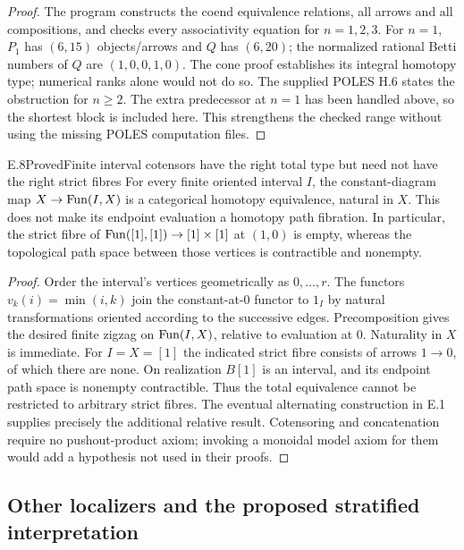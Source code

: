 \begin{proof}
The program constructs the coend equivalence relations, all arrows and all compositions, and checks every associativity equation for $n=1,2,3$. For $n=1$, $P_1$ has $(6,15)$ objects/arrows and $Q$ has $(6,20)$; the normalized rational Betti numbers of $Q$ are $(1,0,0,1,0)$. The cone proof establishes its integral homotopy type; numerical ranks alone would not do so. The supplied POLES H.6 states the obstruction for $n\geq2$. The extra predecessor at $n=1$ has been handled above, so the shortest block is included here. This strengthens the checked range without using the missing POLES computation files.
\end{proof}

\begin{result}{E.8}{Proved}{Finite interval cotensors have the right total type but need not have the right strict fibres}
For every finite oriented interval $I$, the constant-diagram map $X\to\operatorname{Fun}(I,X)$ is a categorical homotopy equivalence, natural in $X$. This does not make its endpoint evaluation a homotopy path fibration. In particular, the strict fibre of $\operatorname{Fun}([1],[1])\to[1]\times[1]$ at $(1,0)$ is empty, whereas the topological path space between those vertices is contractible and nonempty.
\end{result}
\begin{proof}
Order the interval's vertices geometrically as $0,\ldots,r$. The functors $v_k(i)=\min(i,k)$ join the constant-at-$0$ functor to $1_I$ by natural transformations oriented according to the successive edges. Precomposition gives the desired finite zigzag on $\operatorname{Fun}(I,X)$, relative to evaluation at $0$. Naturality in $X$ is immediate. For $I=X=[1]$ the indicated strict fibre consists of arrows $1\to0$, of which there are none. On realization $B[1]$ is an interval, and its endpoint path space is nonempty contractible. Thus the total equivalence cannot be restricted to arbitrary strict fibres. The eventual alternating construction in E.1 supplies precisely the additional relative result. Cotensoring and concatenation require no pushout-product axiom; invoking a monoidal model axiom for them would add a hypothesis not used in their proofs.
\end{proof}

\subsection{Other localizers and the proposed stratified interpretation}

